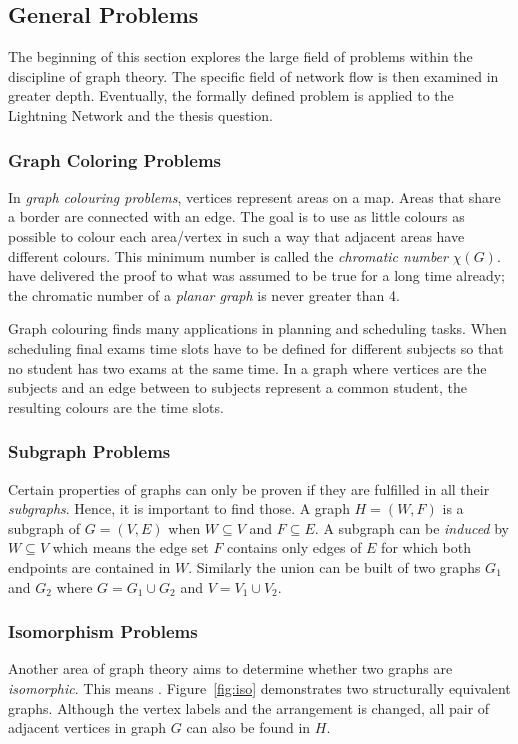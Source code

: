 \documentclass[final]{fhnwreport}       %
\begin{document}
\subsection{General Problems}\label{subsec:genprob}
The beginning of this section explores the large field of problems within the discipline of graph theory. The specific field of network flow is then examined in greater depth. Eventually, the formally defined problem is applied to the Lightning Network and the thesis question.

\subsubsection{Graph Coloring Problems}
In \emph{graph colouring problems}, vertices represent areas on a map. Areas that share a border are connected with an edge. The goal is to use as little colours as possible to colour each area/vertex in such a way that adjacent areas have different colours. This minimum number is called the \emph{chromatic number} $\chi(G)$. \textcite{steen_four-color_1978} have delivered the proof to what was assumed to be true for a long time already; the chromatic number of a \emph{planar graph} is never greater than 4. 

Graph colouring finds many applications in planning and scheduling tasks. When scheduling final exams time slots have to be defined for different subjects so that no student has two exams at the same time. In a graph where vertices are the subjects and an edge between to subjects represent a common student, the resulting colours are the time slots.

\subsubsection{Subgraph Problems}
Certain properties of graphs can only be proven if they are fulfilled in all their \emph{subgraphs}. Hence, it is important to find those. A graph $H = (W, F)$ is a subgraph of $G = (V, E)$ when $W \subseteq V$ and $F \subseteq E$. A subgraph can be \emph{induced} by $W \subseteq V$ which means the edge set $F$ contains only edges of $E$ for which both endpoints are contained in $W$. Similarly the union can be built of two graphs $G_1$ and $G_2$ where $G = G_1 \cup G_2$ and $V = V_1 \cup V_2$. 

\subsubsection{Isomorphism Problems}
Another area of graph theory aims to determine whether two graphs are \emph{isomorphic}. This means . Figure~\ref{fig:iso} demonstrates two structurally equivalent graphs. Although the vertex labels and the arrangement is changed, all pair of adjacent vertices in graph $G$ can also be found in $H$. 
\end{document}
